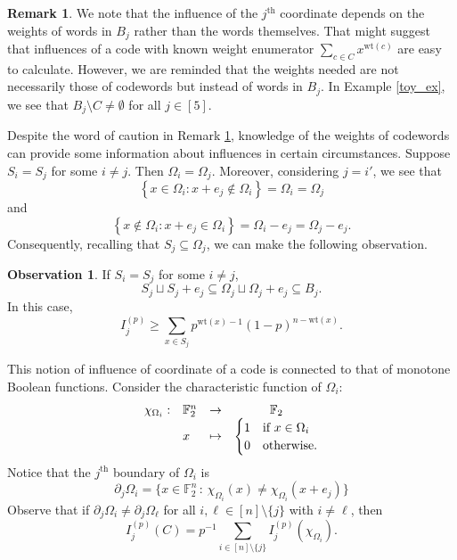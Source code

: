 \documentclass[12pt]{article}
\newcommand{\F}{\mathbb{F}}
\newcommand{\wt}{\mathrm{wt}}
\def\F{\mathbb F}
\newcommand{\FF}{\mathbb{F}}
\theoremstyle{definition}
\newtheorem{remark}[theorem]{Remark}
\newtheorem{obs}[theorem]{Observation}
\begin{document}
\begin{remark} \label{wt_enum_rem}
We note that the influence of the $j^\mathrm{th}$ coordinate depends on the weights of words in $B_j$ rather than the words themselves. That might suggest that influences of a code with known weight enumerator $\sum_{c \in C} x^{\wt(c)}$ are easy to calculate. However, we are reminded that the weights needed are not necessarily those of codewords but instead of words in $B_j$. In Example \ref{toy_ex}, we see that $B_j \setminus C \neq \emptyset$ for all $j \in [5]$. 
\end{remark}

Despite the word of caution in Remark \ref{wt_enum_rem}, knowledge of the weights of codewords can provide some information about influences in certain circumstances. Suppose
$S_i=S_{j}$ for some $i \neq j$. Then $\Omega_i=\Omega_{j}$. Moreover, considering $j = i'$, we see that 
$$\left\{ x \in \Omega_i \colon x+e_j \notin \Omega_i \right\} = \Omega_i = \Omega_j$$
and 
$$\left\{ x \notin \Omega_i \colon x+e_j \in \Omega_i \right\} = \Omega_i-e_j = \Omega_j-e_j.$$
Consequently, recalling that $S_j \subseteq \Omega_j$, we can make the following observation. 

\begin{obs}
If $S_i=S_j$ for some $i \neq j$, $$S_j \sqcup S_j+e_j \subseteq
\Omega_j \sqcup \Omega_j+e_j \subseteq B_j.
$$ In this case, $$I_j^{(p)} \geq \sum_{x \in S_j} p^{\wt({x}) - 1}(1-p)^{n - \wt({x})}.$$
\end{obs}
    



This notion of influence of coordinate of a code is connected to that of monotone Boolean functions. Consider the characteristic function of $\Omega_i$:
$$
\begin{array}{lllc}
\chi_{\Omega_i}: &\F_2^n &\rightarrow & \F_2 \\ 
&x & \mapsto & \begin{cases} 1 & \textnormal{if } x \in \Omega_i \\ 0 & \textnormal{otherwise}. \end{cases}
\end{array}
$$
Notice that the \(j^\text{th}\) boundary of $\Omega_i$ is \[
\partial_j \Omega_i = \{{x} \in \FF_2^n \,:\, \chi_{\Omega_i}({x}) \neq \chi_{\Omega_i}({x} + {e}_j)\}
\]
Observe that if $\partial_j\Omega_i \neq \partial_j\Omega_\ell$ for all $i, \ell \in [n] \setminus \{ j \}$ with $i \neq \ell$, then 
$$I^{(p)}_j(C) = p^{-1} \sum_{i \in [n] \setminus \{ j \}} I^{(p)}_j(\chi_{\Omega_i}).$$
\end{document}
